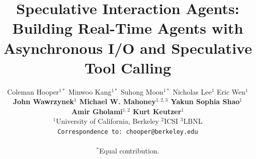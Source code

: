 \documentclass{article} %
\title{Speculative Interaction Agents: Building Real-Time Agents with Asynchronous I/O and Speculative Tool Calling}
\author{%
  Coleman Hooper$^{1*}$\enskip\enskip
  Minwoo Kang$^{1*}$\enskip\enskip
  Suhong Moon$^{1*}$\enskip\enskip
  Nicholas Lee$^{1}$\enskip\enskip
  Eric Wen$^{1}$\\[0.75mm]
  \textbf{
  John Wawrzynek$^{1}$\enskip\enskip
  Michael W. Mahoney$^{1,2,3}$\enskip\enskip
  Yakun Sophia Shao$^{1}$}\\[0.75mm]
  \textbf{
  Amir Gholami$^{1,2}$\enskip\enskip
  Kurt Keutzer$^{1}$}\\[0.75mm]
  $^{1}$University of California, Berkeley \enspace
  $^{2}$ICSI \enspace
  $^{3}$LBNL \\[0.75mm]
  \texttt{\small{Correspondence to: chooper@berkeley.edu}}\\
  \vspace{-2mm}\\
  \small{$^{*}$Equal contribution.}
}
\begin{document}
\ifcolmsubmission
\linenumbers
\fi

\maketitle












\appendix


\end{document}
